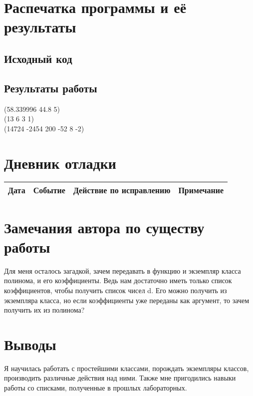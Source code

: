\documentclass[12pt]{article}
\begin{document}
\section{Распечатка программы и её результаты}

\subsection{Исходный код}


\subsection{Результаты работы}
(58.339996 44.8 5) \\
(13 6 3 1) \\
(14724 -2454 200 -52 8 -2) \\

\section{Дневник отладки}
\begin{tabular}{|p{50pt}|p{130pt}|p{130pt}|p{70pt}|}
\hline
Дата & Событие & Действие по исправлению & Примечание\\
\hline
\end{tabular}

\section{Замечания автора по существу работы}
Для меня осталось загадкой, зачем передавать в функцию и экземпляр класса полинома, и его коэффициенты. Ведь нам достаточно иметь только список коэффициентов, чтобы получить список чисел d. Его можно получить из экземпляра класса, но если коэффициенты уже переданы как аргумент, то зачем получить их из полинома?

\section{Выводы}
Я научилась работать с простейшими классами, порождать экземпляры классов, производить различные действия над ними. Также мне пригодились навыки работы со списками, полученные в прошлых лабораторных.
\end{document}
